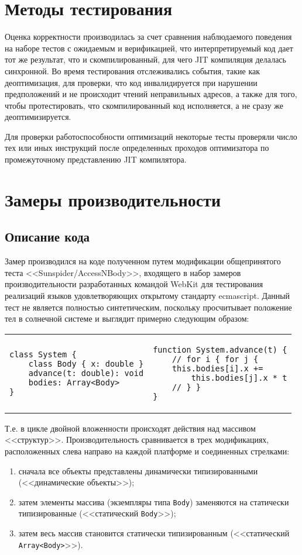\documentclass[times
]{itmo-student-thesis}
\begin{document}
\section{Методы тестирования}
Оценка корректности производилась за счет сравнения наблюдаемого поведения на наборе тестов с ожидаемым и верификацией, что интерпретируемый код дает тот же результат, что и скомпилированный, для чего JIT компиляция делалась синхронной. Во время тестирования отслеживались события, такие как деоптимизация, для проверки, что код инвалидируется при нарушении предположений и не происходит чтений неправильных адресов, а также для того, чтобы протестировать, что скомпилированный код исполняется, а не сразу же деоптимизируется.

Для проверки работоспособности оптимизаций некоторые тесты проверяли число тех или иных инструкций после определенных проходов оптимизатора по промежуточному представлению JIT компилятора.

\section{Замеры производительности}\label{sec:sunspider}
\subsection{Описание кода}
Замер производился на коде полученном путем модификации общепринятого теста <<Sunspider/AccessNBody>>, входящего в набор замеров производительности разработанных командой WebKit для тестирования реализаций языков удовлетворяющих открытому стандарту ecmascript. Данный тест не является полностью синтетическим, поскольку просчитывает положение тел в солнечной системе и выглядит примерно следующим образом:

\begin{center}
\begin{tabular}[t]{p{}|p{}}
\begin{lstlisting}
class System {
	class Body { x: double }
	advance(t: double): void
	bodies: Array<Body>
}
\end{lstlisting} &
\begin{lstlisting}
function System.advance(t) {
	// for i { for j {
	this.bodies[i].x +=
		this.bodies[j].x * t
	// } }
}
\end{lstlisting}
\end{tabular}
\end{center}

Т.е. в цикле двойной вложенности происходят действия над массивом <<структур>>. Производительность сравнивается в трех модификациях, расположенных слева направо на каждой платформе и соединенных стрелками:
\begin{enumerate}
	\item сначала все объекты представлены динамически типизированными (<<динамические объекты>>);
	\item затем элементы массива (экземпляры типа \texttt{Body}) заменяются на статически типизированные (<<статический \texttt{Body}>>);
	\item затем весь массив становится статически типизированным (<<статический \texttt{Array<Body>}>>).
\end{enumerate}
\end{document}
